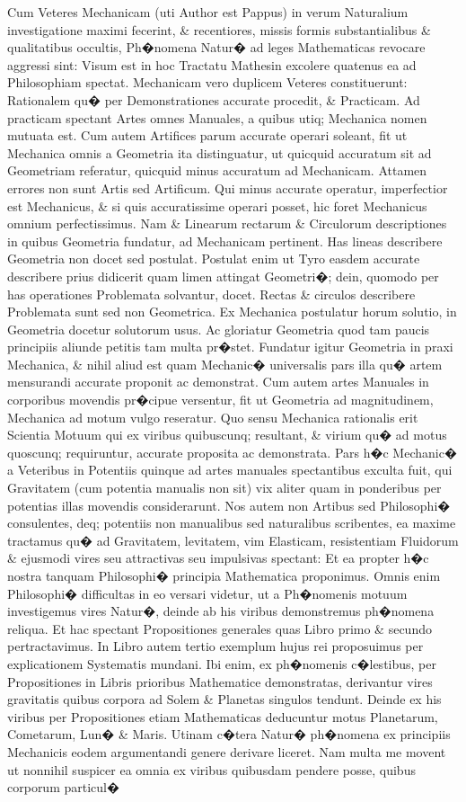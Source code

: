 \documentclass[oneside,12pt,final]{sty/ucthesis-CA2012}
\begin{document}
\begin{mainmatter}
Cum Veteres Mechanicam (uti Author est Pappus) in verum Naturalium investigatione maximi fecerint, \& recentiores, missis formis substantialibus \& qualitatibus occultis, Ph�nomena Natur� ad leges Mathematicas revocare aggressi sint: Visum est in hoc Tractatu Mathesin excolere quatenus ea ad Philosophiam spectat. Mechanicam vero duplicem Veteres constituerunt: Rationalem qu� per Demonstrationes accurate procedit, \& Practicam. Ad practicam spectant Artes omnes Manuales, a quibus utiq; Mechanica nomen mutuata est. Cum autem Artifices parum accurate operari soleant, fit ut Mechanica omnis a Geometria ita distinguatur, ut quicquid accuratum sit ad Geometriam referatur, quicquid minus accuratum ad Mechanicam. Attamen errores non sunt Artis sed Artificum. Qui minus accurate operatur, imperfectior est Mechanicus, \& si quis accuratissime operari posset, hic foret Mechanicus omnium perfectissimus. Nam \& Linearum rectarum \& Circulorum descriptiones in quibus Geometria fundatur, ad Mechanicam pertinent. Has lineas describere Geometria non docet sed postulat. Postulat enim ut Tyro easdem accurate describere prius didicerit quam limen attingat Geometri�; dein, quomodo per has operationes Problemata solvantur, docet. Rectas \& circulos describere Problemata sunt sed non Geometrica. Ex Mechanica postulatur horum solutio, in Geometria docetur solutorum usus. Ac gloriatur Geometria quod tam paucis principiis aliunde petitis tam multa pr�stet. Fundatur igitur Geometria in praxi Mechanica, \& nihil aliud est quam Mechanic� universalis pars illa qu� artem mensurandi accurate proponit ac demonstrat. Cum autem artes Manuales in corporibus movendis pr�cipue versentur, fit ut Geometria ad magnitudinem, Mechanica ad motum vulgo reseratur. Quo sensu Mechanica rationalis erit Scientia Motuum qui ex viribus quibuscunq; resultant, \& virium qu� ad motus quoscunq; requiruntur, accurate proposita ac demonstrata. Pars h�c Mechanic� a Veteribus in Potentiis quinque ad artes manuales spectantibus exculta fuit, qui Gravitatem (cum potentia manualis non sit) vix aliter quam in ponderibus per potentias illas movendis considerarunt. Nos autem non Artibus sed Philosophi� consulentes, deq; potentiis non manualibus sed naturalibus scribentes, ea maxime tractamus qu� ad Gravitatem, levitatem, vim Elasticam, resistentiam Fluidorum \& ejusmodi vires seu attractivas seu impulsivas spectant: Et ea propter h�c nostra tanquam Philosophi� principia Mathematica proponimus. Omnis enim Philosophi� difficultas in eo versari videtur, ut a Ph�nomenis motuum investigemus vires Natur�, deinde ab his viribus demonstremus ph�nomena reliqua. Et hac spectant Propositiones generales quas Libro primo \& secundo pertractavimus. In Libro autem tertio exemplum hujus rei proposuimus per explicationem Systematis mundani. Ibi enim, ex ph�nomenis c�lestibus, per Propositiones in Libris prioribus Mathematice demonstratas, derivantur vires gravitatis quibus corpora ad Solem \& Planetas singulos tendunt. Deinde ex his viribus per Propositiones etiam Mathematicas deducuntur motus Planetarum, Cometarum, Lun� \& Maris. Utinam c�tera Natur� ph�nomena ex principiis Mechanicis eodem argumentandi genere derivare liceret. Nam multa me movent ut nonnihil suspicer ea omnia ex viribus quibusdam pendere posse, quibus corporum particul� 
\end{mainmatter}
\end{document}
